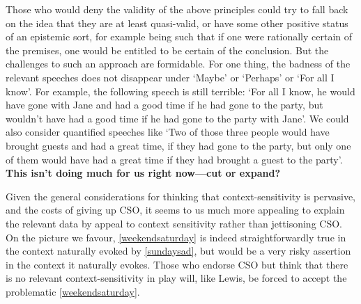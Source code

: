 \documentclass[If.tex]{subfiles}
\begin{document}
Those who would deny the validity of the above principles could try to fall back on the idea that they are at least quasi-valid, or have some other positive status of an epistemic sort, for example being such that if one were rationally certain of the premises, one would be entitled to be certain of the conclusion. But the challenges to such an approach are formidable. For one thing, the badness of the relevant speeches does not disappear under ‘Maybe’ or ‘Perhaps’ or ‘For all I know’. For example, the following speech is still terrible: ‘For all I know, he would have gone with Jane and had a good time if he had gone to the party, but wouldn't have had a good time if he had gone to the party with Jane’. We could also consider quantified speeches like ‘Two of those three people would have brought guests and had a great time, if they had gone to the party, but only one of them would have had a great time if they had brought a guest to the party’. \textbf{This isn't doing much for us right now---cut or expand?}


Given the general considerations for thinking that context-sensitivity is pervasive, and the costs of giving up CSO, it seems to us much more appealing to explain the relevant data by appeal to context sensitivity rather than jettisoning CSO. On the picture we favour, \ref{weekendsaturday} is indeed straightforwardly true in the context naturally evoked by \ref{sundaysad}, but would be a very risky assertion in the context it naturally evokes. Those who endorse CSO but think that there is no relevant context-sensitivity in play will, like Lewis, be forced to accept the problematic \ref{weekendsaturday}.
\end{document}
